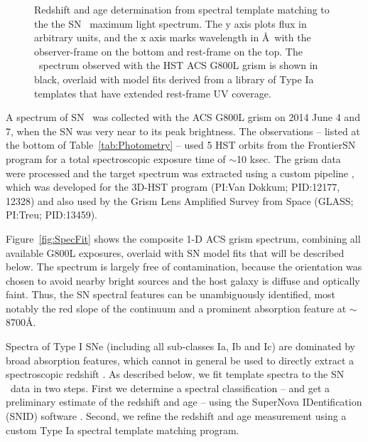 \begin{figure}
\begin{center}
{Redshift and age determination from spectral template matching to the
the SN \tomas\ maximum light spectrum.  The y axis plots flux in
arbitrary units, and the x axis marks wavelength in \AA\ with the
observer-frame on the bottom and rest-frame on the top.  The \tomas\
spectrum observed with the HST ACS G800L grism is shown in black,
overlaid with model fits derived from a library of Type Ia templates
that have extended rest-frame UV coverage.  
}
\end{center}
\end{figure}


A spectrum of SN \tomas\ was collected with the ACS G800L grism on
2014 June 4 and 7, when the SN was very near to its peak brightness.
The observations -- listed at the bottom of Table~\ref{tab:Photometry}
-- used 5 HST orbits from the FrontierSN program for a total
spectroscopic exposure time of $\sim$10 ksec.  The grism data were
processed and the target spectrum was extracted using a custom
pipeline \citep{Brammer:2012}, which was developed for the 3D-HST
program (PI:Van Dokkum; PID:12177, 12328) and also used by the Grism
Lens Amplified Survey from Space (GLASS; PI:Treu; PID:13459).

Figure~\ref{fig:SpecFit} shows the composite 1-D ACS grism spectrum,
combining all available G800L exposures, overlaid with SN model fits
that will be described below.  The spectrum is largely free of
contamination, because the orientation was chosen to avoid nearby
bright sources and the host galaxy is diffuse and optically faint.
Thus, the SN spectral features can be unambiguously identified, most
notably the red slope of the continuum and a prominent absorption
feature at $\sim$8700\AA.  


Spectra of Type I SNe (including all sub-classes Ia, Ib and Ic) are
dominated by broad absorption features, which cannot in general be
used to directly extract a spectroscopic redshift \citep[see
e.g.][]{Filippenko:1997}.  As described below, we fit template spectra
to the SN \tomas\ data in two steps.  First we determine a spectral
classification -- and get a preliminary estimate of the redshift and
age -- using the SuperNova IDentification (SNID)
software \citep{Blondin:2007}.  Second, we refine the redshift and age
measurement using a custom Type Ia spectral template matching program.

